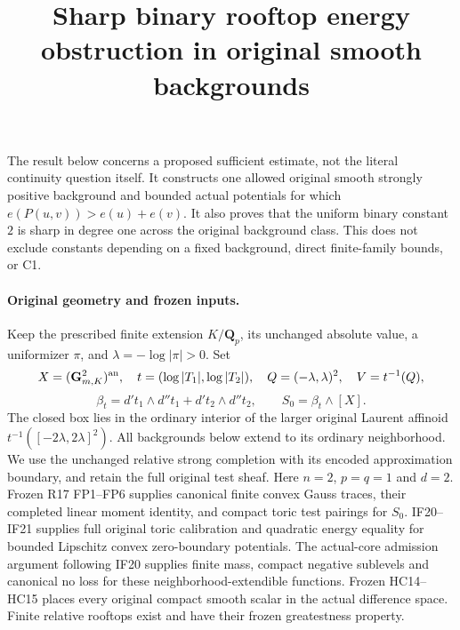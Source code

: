 \documentclass{article}
\begin{document}
\title{Sharp binary rooftop energy obstruction in original smooth backgrounds}
\date{}\maketitle

The result below concerns a proposed sufficient estimate, not the literal
continuity question itself. It constructs one allowed original smooth
strongly positive background and bounded actual potentials for which
$e(P(u,v))>e(u)+e(v)$. It also proves that the uniform binary constant $2$ is sharp in degree
one across the original background class. This does not exclude constants
depending on a fixed background, direct finite-family bounds, or C1.

\paragraph{Original geometry and frozen inputs.}
Keep the prescribed finite extension $K/\mathbf Q_p$, its unchanged
absolute value, a uniformizer $\pi$, and $\lambda=-\log|\pi|>0$. Set
\[
 X=(\mathbf G_{m,K}^2)^{\rm an},\quad
 t=(\log|T_1|,\log|T_2|),\quad Q=(-\lambda,\lambda)^2,
 \quad V=t^{-1}(Q),
\]
\[
 \beta_t=d't_1\wedge d''t_1+d't_2\wedge d''t_2,
 \qquad S_0=\beta_t\wedge[X].
\]
The closed box lies in the ordinary interior of the larger original
Laurent affinoid $t^{-1}([-2\lambda,2\lambda]^2)$. All backgrounds below
extend to its ordinary neighborhood. We use the unchanged relative
strong completion with its encoded approximation boundary, and retain
the full original test sheaf. Here $n=2$, $p=q=1$ and $d=2$.
Frozen R17 FP1--FP6 supplies canonical finite convex Gauss traces,
their completed linear moment identity, and compact toric test pairings
for $S_0$. IF20--IF21 supplies full original toric calibration and
quadratic energy equality for bounded Lipschitz convex zero-boundary
potentials. The actual-core admission argument following IF20 supplies
finite mass, compact negative sublevels and canonical no loss for these
neighborhood-extendible functions. Frozen HC14--HC15 places every original
compact smooth scalar in the actual difference space. Finite relative
rooftops exist and have their frozen greatestness property.
\end{document}
